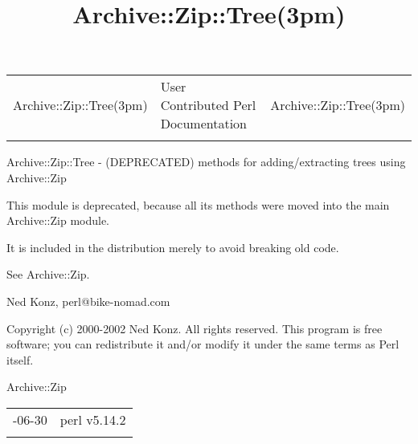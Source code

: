 \documentclass[]{article}
\title{Archive::Zip::Tree(3pm)}
\author{}
\date{}
\begin{document}
\maketitle

\begin{longtable}[c]{@{}lll@{}}
\toprule\addlinespace
Archive::Zip::Tree(3pm) & User Contributed Perl Documentation &
Archive::Zip::Tree(3pm)
\\\addlinespace
\bottomrule
\end{longtable}


Archive::Zip::Tree - (DEPRECATED) methods for adding/extracting trees
using Archive::Zip



This module is deprecated, because all its methods were moved into the
main Archive::Zip module.

It is included in the distribution merely to avoid breaking old code.

See Archive::Zip.


Ned Konz, perl@bike-nomad.com


Copyright (c) 2000-2002 Ned Konz. All rights reserved. This program is
free software; you can redistribute it and/or modify it under the same
terms as Perl itself.


Archive::Zip

\begin{longtable}[c]{@{}ll@{}}
\toprule\addlinespace
2009-06-30 & perl v5.14.2
\\\addlinespace
\bottomrule
\end{longtable}
\end{document}

